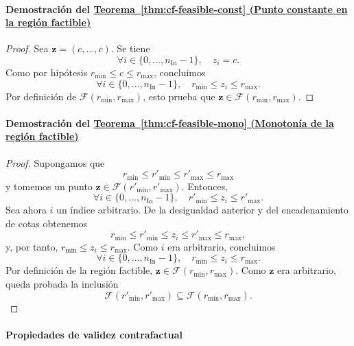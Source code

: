 \documentclass[12pt]{report} %
\begin{document}
\paragraph*{Demostración del \hyperref[thm:cf-feasible-const]{Teorema~\ref*{thm:cf-feasible-const} (Punto constante en la región factible)}}
\begin{proof}
    Sea $\mathbf{z} = (c, \ldots, c)$. Se tiene
    $$\forall i \in \{0, \ldots, n_{\text{In}}-1\},\quad z_i = c.$$
    Como por hipótesis $r_{\min} \le c \le r_{\max}$, concluimos
    $$\forall i \in \{0, \ldots, n_{\text{In}}-1\},\quad r_{\min} \le z_i \le r_{\max}.$$
    Por definición de $\mathcal{F}(r_{\min}, r_{\max})$, esto prueba que $\mathbf{z} \in \mathcal{F}(r_{\min}, r_{\max})$.
\end{proof}

\paragraph*{Demostración del \hyperref[thm:cf-feasible-mono]{Teorema~\ref*{thm:cf-feasible-mono} (Monotonía de la región factible)}}
\begin{proof}
    Supongamos que
    $$r_{\min} \le r'_{\min} \le r'_{\max} \le r_{\max}$$
    y tomemos un punto $\mathbf{z} \in \mathcal{F}(r'_{\min}, r'_{\max})$. Entonces,
    $$\forall i \in \{0, \ldots, n_{\text{In}}-1\},\quad r'_{\min} \le z_i \le r'_{\max}.$$
    Sea ahora $i$ un índice arbitrario. De la desigualdad anterior y del encadenamiento de cotas obtenemos
    $$r_{\min} \le r'_{\min} \le z_i \le r'_{\max} \le r_{\max},$$
    y, por tanto, $r_{\min} \le z_i \le r_{\max}$. Como $i$ era arbitrario, concluimos
    $$\forall i \in \{0, \ldots, n_{\text{In}}-1\},\quad r_{\min} \le z_i \le r_{\max}.$$
    Por definición de la región factible, $\mathbf{z} \in \mathcal{F}(r_{\min}, r_{\max})$. Como $\mathbf{z}$ era arbitrario, queda probada la inclusión
    $$\mathcal{F}(r'_{\min}, r'_{\max}) \subseteq \mathcal{F}(r_{\min}, r_{\max}).$$
\end{proof}

\paragraph*{Propiedades de validez contrafactual}
\end{document}
